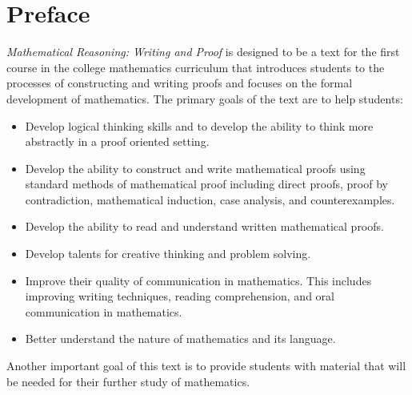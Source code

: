 
\chapter{Preface}
\emph{Mathematical Reasoning:  Writing and Proof} is designed to be a text for the first course in the college mathematics curriculum that introduces students to the processes of constructing and writing proofs and focuses on the formal development of mathematics.    The primary goals of the text are to help students:
\begin{itemize}
  \item Develop logical thinking skills and to develop the ability to think more abstractly in a proof oriented setting.
  \item Develop the ability to construct and write mathematical proofs using standard methods of mathematical proof including direct proofs, proof by contradiction, mathematical induction, case analysis, and counterexamples.
  \item Develop the ability to read and understand written mathematical proofs. 
  \item Develop talents for creative thinking and problem solving.
  \item Improve their quality of communication in mathematics.  This includes improving writing techniques, reading comprehension, and oral communication in mathematics.
  \item Better understand the nature of mathematics and its language.
\end{itemize}
Another important goal of this text is to provide students with material that will be needed for their further study of mathematics.

